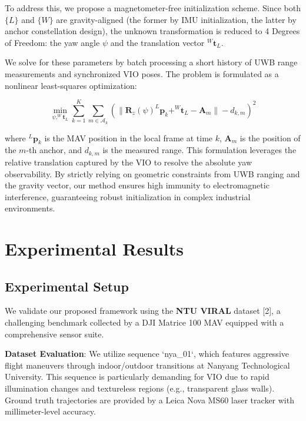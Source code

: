\documentclass[conference]{IEEEtran}
\begin{document}
To address this, we propose a magnetometer-free initialization scheme. Since both $\{L\}$ and $\{W\}$ are gravity-aligned (the former by IMU initialization, the latter by anchor constellation design), the unknown transformation is reduced to 4 Degrees of Freedom: the yaw angle $\psi$ and the translation vector $^W\mathbf{t}_L$.

We solve for these parameters by batch processing a short history of UWB range measurements and synchronized VIO poses. The problem is formulated as a nonlinear least-squares optimization:

\begin{equation}
\min_{\psi, ^W\mathbf{t}_L} \sum_{k=1}^{K} \sum_{m \in \mathcal{A}_k} \left( \| \mathbf{R}_z(\psi) ^L\mathbf{p}_{k} + ^W\mathbf{t}_L - \mathbf{A}_m \| - d_{k,m} \right)^2
\end{equation}

where $^L\mathbf{p}_{k}$ is the MAV position in the local frame at time $k$, $\mathbf{A}_m$ is the position of the $m$-th anchor, and $d_{k,m}$ is the measured range. This formulation leverages the relative translation captured by the VIO to resolve the absolute yaw observability. By strictly relying on geometric constraints from UWB ranging and the gravity vector, our method ensures high immunity to electromagnetic interference, guaranteeing robust initialization in complex industrial environments.

\section{Experimental Results}

\subsection{Experimental Setup}
We validate our proposed framework using the \textbf{NTU VIRAL} dataset [2], a challenging benchmark collected by a DJI Matrice 100 MAV equipped with a comprehensive sensor suite.

\textbf{Dataset Evaluation}:
We utilize sequence `nya\_01`, which features aggressive flight maneuvers through indoor/outdoor transitions at Nanyang Technological University. This sequence is particularly demanding for VIO due to rapid illumination changes and textureless regions (e.g., transparent glass walls). Ground truth trajectories are provided by a Leica Nova MS60 laser tracker with millimeter-level accuracy.
\end{document}
